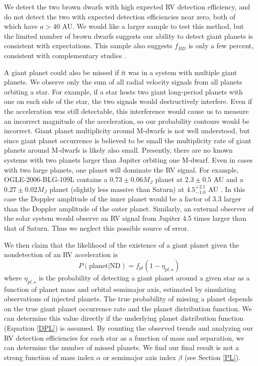 We detect the two brown dwarfs with high expected RV detection efficiency, and do not detect the two with expected detection efficiencies near zero, both of which have $a > 40$ AU. We would like a larger sample to test this method, but the limited number of brown dwarfs suggests our ability to detect giant planets is consistent with expectations. This sample also suggests $f_{BD}$ is only a few percent, consistent with complementary studies \citep{Dieterich12}.


A giant planet could also be missed if it was in a system with multiple giant planets. We observe only the sum of all radial velocity signals from all planets orbiting a star. For example, if a star hosts two giant long-period planets with one on each side of the star, the two signals would destructively interfere. Even if the acceleration was still detectable, this interference would cause us to measure an incorrect magnitude of the acceleration, so our probability contours would be incorrect. Giant planet multiplicity around M-dwarfs is not well understood, but since giant planet occurrence is believed to be small \citep{Bonfils13} the multiplicity rate of giant planets around M-dwarfs is likely also small. Presently, there are no known systems with two planets larger than Jupiter orbiting one M-dwarf. Even in cases with two large planets, one planet will dominate the RV signal. For example, OGLE-2006-BLG-109L contains a $0.73 \pm 0.06 M_J$ planet at $2.3 \pm 0.5$ AU and a $0.27 \pm 0.02 M_J$ planet (slightly less massive than Saturn) at $4.5^{+2.1}_{-1.0}$ AU \citep{Gaudi08, Bennett10}. In this case the Doppler amplitude of the inner planet would be a factor of 3.3 larger than the Doppler amplitude of the outer planet. Similarly, an external observer of the solar system would observe an RV signal from Jupiter 4.5 times larger than that of Saturn. Thus we neglect this possible source of error.


We then claim that the likelihood of the existence of a giant planet given the nondetection of an RV acceleration is 
\begin{equation}
P(\mbox{planet}|\mbox{ND}) = f_{pl}(1-\eta_{pl,\star})
\label{FNP} 
\end{equation}
where $\eta_{pl, \star}$ is the probability of detecting a giant planet around a given star as a function of planet mass and orbital semimajor axis, estimated by simulating observations of injected planets. The true probability of missing a planet depends on the true giant planet occurrence rate and the planet distribution function. We can determine this value directly if the underlying planet distribution function (Equation \ref{DPL}) is assumed. By counting the observed trends and analyzing our RV detection efficiencies for each star as a function of mass and separation, we can determine the number of missed planets. We find our final result is not a strong function of mass index $\alpha$ or semimajor axis index $\beta$ (see Section \ref{PL}).

